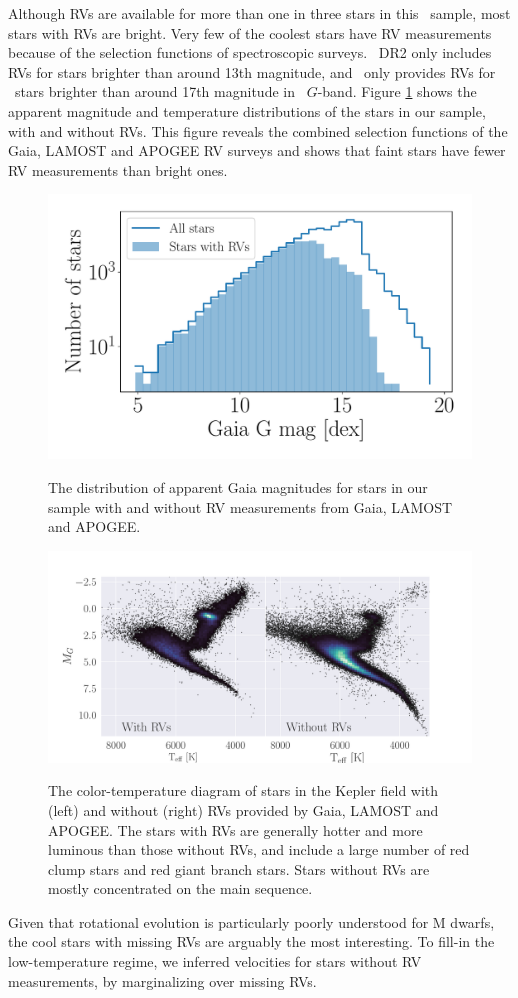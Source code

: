 Although RVs are available for more than one in three stars in this \kepler\
sample, most stars with RVs are bright.
Very few of the coolest stars have RV measurements because of the selection
functions of spectroscopic surveys.
\gaia\ DR2 only includes RVs for stars brighter than around 13th magnitude,
and \lamost\ only provides RVs for \kepler\ stars brighter than around 17th
magnitude in \gaia\ $G$-band.
Figure \ref{fig:rv_histogram} shows the apparent magnitude and temperature
distributions of the stars in our sample, with and without RVs.
This figure reveals the combined selection functions of the Gaia, LAMOST and
APOGEE RV surveys and shows that faint stars have fewer RV measurements than
bright ones.
\begin{figure}[ht!]
\caption{
    The distribution of apparent Gaia magnitudes for
    stars in our sample with and without RV measurements from Gaia, LAMOST and
    APOGEE.
}
  \centering \includegraphics[width=.5\textwidth]{rv_histogram}
\label{fig:rv_histogram}
\end{figure}
\begin{figure}[ht!]
\caption{
    The color-temperature diagram of stars in the Kepler field with (left)
    and without (right) RVs provided by Gaia, LAMOST and APOGEE.
    The stars with RVs are generally hotter and more luminous than those
    without RVs, and include a large number of red clump stars and red giant
    branch stars.
    Stars without RVs are mostly concentrated on the main sequence.
}
  \centering \includegraphics[width=1\textwidth]{CMD}
\label{fig:CMD}
\end{figure}
Given that rotational evolution is particularly poorly understood for M
dwarfs, the cool stars with missing RVs are arguably the most interesting.
To fill-in the low-temperature regime, we inferred velocities for stars
without RV measurements, by marginalizing over missing RVs.

